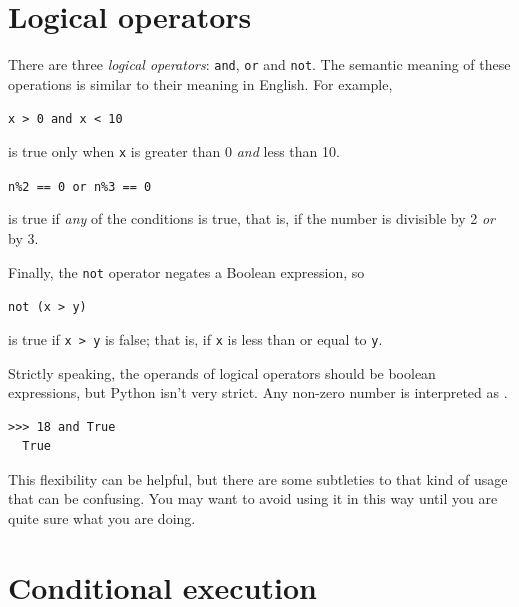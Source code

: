 \hypertarget{operadores-luxf3gicos}{%
\section{Logical operators}\label{operadores-luxf3gicos}}

 

There are three \emph{logical operators}: \texttt{and}, \texttt{or} and \texttt{not}. The semantic meaning of these operations is similar to their meaning in English. For example,

\texttt{x\ \textgreater{}\ 0\ and\ x\ \textless{}\ 10}

is true only when \texttt{x} is greater than 0 \emph{and} less than 10.

  
  

\texttt{n\%2\ ==\ 0\ or\ n\%3\ ==\ 0} 

is true if \emph{any} of the conditions is true, that is, if the number is divisible by 2 \emph{or} by 3.

Finally, the \texttt{not} operator negates a Boolean expression, so

\texttt{not\ (x\ >\ y)} 

is true if \texttt{x\ >\ y} is false; that is, if \texttt{x} is less than or equal to \texttt{y}.

Strictly speaking, the operands of logical operators should be boolean expressions, but Python isn't very strict. Any non-zero number is interpreted as .

\begin{Verbatim}[frame=single]
>>> 18 and True
  True
\end{Verbatim}

This flexibility can be helpful, but there are some subtleties to that kind of usage that can be confusing. You may want to avoid using it in this way until you are quite sure what you are doing.

\hypertarget{ejecuciuxf3n-condicional}{%
\section{Conditional execution}\label{ejecuciuxf3n-condicional}}

 
  


